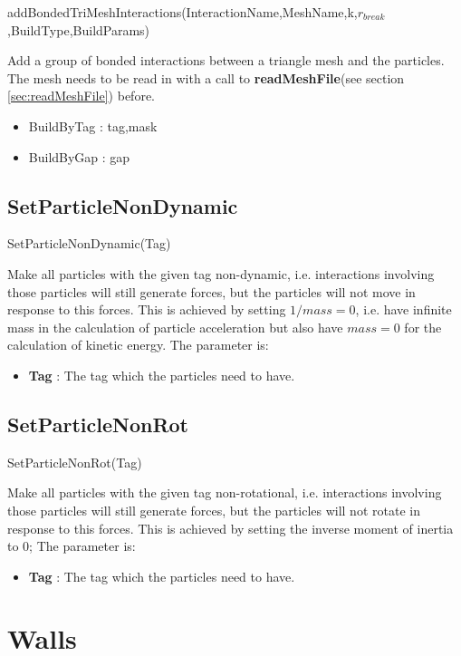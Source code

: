 \documentclass{report}
\begin{document}
\textsf{addBondedTriMeshInteractions(InteractionName,MeshName,k,$r_{break}$,BuildType,BuildParams)}
\par\medskip
Add a group of bonded interactions between a triangle mesh and the particles. The mesh needs to be read in with a call to \textbf{readMeshFile}(see section \ref{sec:readMeshFile}) before.

\begin{itemize}
\item BuildByTag : tag,mask
\item BuildByGap : gap
\end{itemize}
\subsection{SetParticleNonDynamic}

\textsf{SetParticleNonDynamic(Tag)}
\par \medskip
Make all particles with the given tag non-dynamic, i.e. interactions involving those particles will still generate forces, but the particles will not move in response to this forces. This is achieved by setting $1/mass=0$, i.e. have infinite mass in the calculation of particle acceleration but also have $mass=0$ for the calculation of kinetic energy.
The parameter is:
\begin{itemize}
\item \textbf{Tag} : The tag which the particles need to have.
\end{itemize}

\subsection{SetParticleNonRot}

\textsf{SetParticleNonRot(Tag)}
\par \medskip
Make all particles with the given tag non-rotational, i.e. interactions involving those particles will still generate forces, but the particles will not rotate in response to this forces. This is achieved by setting the inverse moment of inertia to 0; 
The parameter is:
\begin{itemize}
\item \textbf{Tag} : The tag which the particles need to have.
\end{itemize}
 
\section{Walls}
\end{document}
